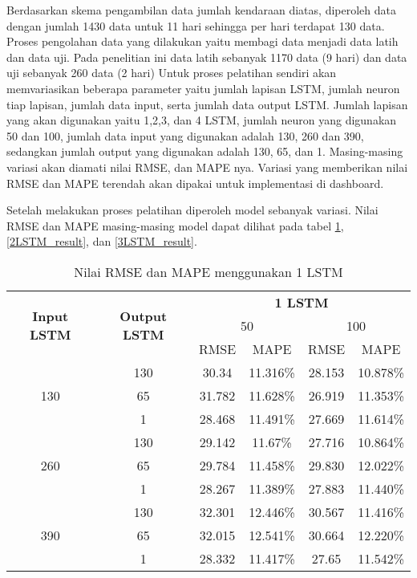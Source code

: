 \documentclass[../thesis.tex]{subfiles}
\begin{document}
Berdasarkan skema pengambilan data jumlah kendaraan diatas, diperoleh data dengan jumlah 1430 data untuk 11 hari sehingga per hari terdapat 130 data.
Proses pengolahan data yang dilakukan yaitu membagi data menjadi data latih dan data uji. Pada penelitian ini data latih sebanyak 1170 data (9 hari) dan data uji sebanyak 260 data (2 hari)
Untuk proses pelatihan sendiri akan memvariasikan beberapa parameter yaitu jumlah lapisan LSTM, jumlah neuron tiap lapisan, jumlah data input, serta jumlah data output LSTM. 
Jumlah lapisan yang akan digunakan yaitu 1,2,3, dan 4 LSTM, jumlah neuron yang digunakan 50 dan 100, jumlah data input yang digunakan adalah 130, 260 dan 390, sedangkan jumlah output yang digunakan adalah 130, 65, dan 1. Masing-masing 
variasi akan diamati nilai RMSE, dan MAPE nya. Variasi yang memberikan nilai RMSE dan MAPE terendah akan dipakai untuk implementasi di dashboard.

Setelah melakukan proses pelatihan diperoleh model sebanyak variasi. Nilai RMSE dan MAPE masing-masing model dapat dilihat pada tabel \ref{1LSTM_result}, \ref{2LSTM_result}, dan \ref{3LSTM_result}.
\begin{table}[htp]
\centering
\begin{tabular}{|c|c|c|c|c|c|}
	\hline 
	\multirow{3}{*}{\textbf{Input LSTM}} & \multirow{3}{*}{\textbf{Output LSTM}} & \multicolumn{4}{c|}{\textbf{1 LSTM}} \\ \cline{3-6}
	&  & \multicolumn{2}{c|}{50}& \multicolumn{2}{c|}{100} \\ \cline{3-6}
	& & RMSE & MAPE& RMSE & MAPE\\
	\hline
	\multirow{3}{*}{130} & 130 & 30.34& 11.316\%& 28.153 & 10.878\%\\
	& 65 & 31.782 & 11.628\% & 26.919 & 11.353\% \\
	& 1 & 28.468 & 11.491\% & 27.669 & 11.614\% \\
	\hline
	\multirow{3}{*}{260} & 130 & 29.142 & 11.67\%  & 27.716 & 10.864\%\\
	& 65 & 29.784 & 11.458\% & 29.830 & 12.022\%\\
	& 1 & 28.267 & 11.389\% & 27.883 & 11.440\% \\
	\hline
	\multirow{3}{*}{390} & 130 & 32.301 & 12.446\% & 30.567 & 11.416\% \\
	& 65 & 32.015 & 12.541\% & 30.664 & 12.220\% \\
	& 1 & 28.332 & 11.417\% & 27.65 & 11.542\% \\
	\hline
\end{tabular}
\caption{Nilai RMSE dan MAPE menggunakan 1 LSTM}
\label{1LSTM_result}
\end{table} 
\end{document}
